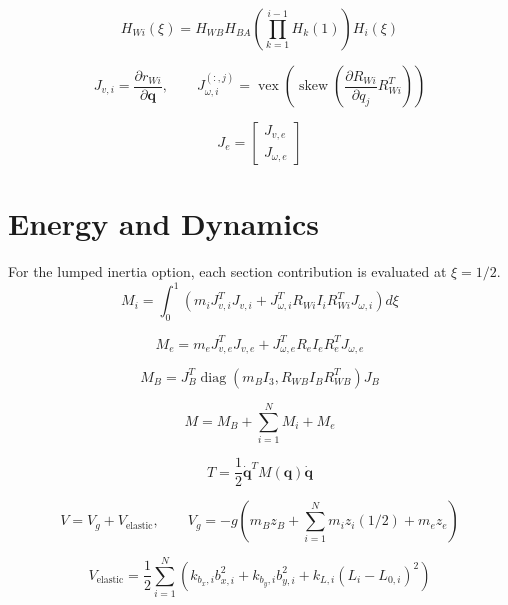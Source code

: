 \documentclass[11pt]{article}
\begin{document}
\begin{equation}
H_{Wi}(\xi)=H_{WB}H_{BA}\left(\prod_{k=1}^{i-1}H_k(1)\right)H_i(\xi)
\end{equation}

\begin{equation}
J_{v,i}=\frac{\partial r_{Wi}}{\partial\boldsymbol q},\qquad J_{\omega,i}^{(:,j)}=\operatorname{vex}\!\left(\operatorname{skew}\!\left(\frac{\partial R_{Wi}}{\partial q_j}R_{Wi}^{T}\right)\right)
\end{equation}

\begin{equation}
J_e=\begin{bmatrix}J_{v,e}\\J_{\omega,e}\end{bmatrix}
\end{equation}


\section{Energy and Dynamics}
For the lumped inertia option, each section contribution is evaluated at $\xi=1/2$.
\begin{equation}
M_i=\int_0^1\!\left(m_iJ_{v,i}^{T}J_{v,i}+J_{\omega,i}^{T}R_{Wi}I_iR_{Wi}^{T}J_{\omega,i}\right)d\xi
\end{equation}

\begin{equation}
M_e=m_eJ_{v,e}^{T}J_{v,e}+J_{\omega,e}^{T}R_eI_eR_e^TJ_{\omega,e}
\end{equation}

\begin{equation}
M_B=J_B^T\operatorname{diag}\!\left(m_BI_3,R_{WB}I_BR_{WB}^T\right)J_B
\end{equation}

\begin{equation}
M=M_B+\sum_{i=1}^{N}M_i+M_e\label{eq:mass-assembly}
\end{equation}

\begin{equation}
T=\frac12\dot{\boldsymbol q}^{T}M(\boldsymbol q)\dot{\boldsymbol q}
\end{equation}

\begin{equation}
V=V_g+V_{\mathrm{elastic}},\qquad V_g=-g\!\left(m_Bz_B+\sum_{i=1}^{N}m_i z_i(1/2)+m_ez_e\right)
\end{equation}

\begin{equation}
V_{\mathrm{elastic}}=\frac12\sum_{i=1}^{N}\left(k_{b_x,i}b_{x,i}^{2}+k_{b_y,i}b_{y,i}^{2}+k_{L,i}(L_i-L_{0,i})^2\right)
\end{equation}
\end{document}
